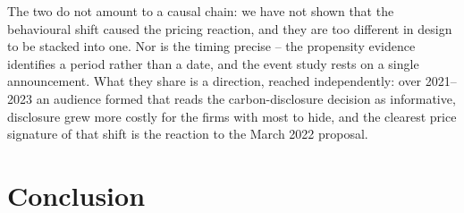 \documentclass[a4paper,12pt]{article}
\newcommand{\citet}[1]{\textcite{#1}}
\newcommand{\note}[1]{\textcolor{blue!60!black}{\textit{#1}}}
\begin{document}
The two do not amount to a causal chain: we have not shown that the behavioural shift caused the pricing reaction, and they are too different in design to be stacked into one. Nor is the timing precise -- the propensity evidence identifies a period rather than a date, and the event study rests on a single announcement. What they share is a direction, reached independently: over 2021--2023 an audience formed that reads the carbon-disclosure decision as informative, disclosure grew more costly for the firms with most to hide, and the clearest price signature of that shift is the reaction to the March 2022 proposal.









\section{Conclusion}
\label{sec:conclusion}
\end{document}
